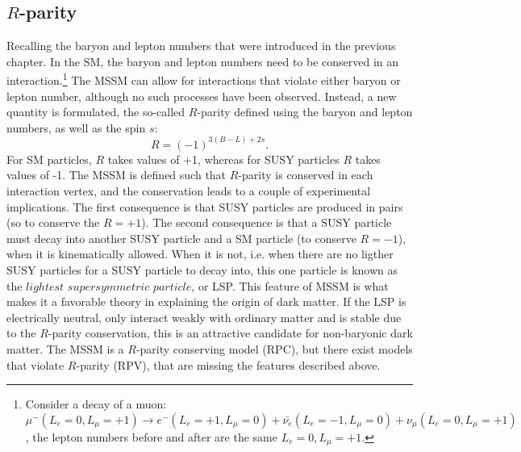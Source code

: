 \subsection*{$R$-parity}
\noindent\justify
Recalling the baryon and lepton numbers that were introduced in the previous chapter. 
In the SM, the baryon and lepton numbers need to be conserved in an interaction.\footnote{Consider a decay of a muon: $\mu^{-} (L_{e}=0, L_{\mu}=+1)\rightarrow e^{-} (L_{e}=+1, L_{\mu}=0) +\bar{\nu_{e}} (L_{e}=-1,L_{\mu}=0)+\nu_{\mu} (L_{e}=0,L_{\mu}=+1)$, the lepton numbers before and after are the same $L_{e}=0, L_{\mu}=+1$.}  
The MSSM can allow for interactions that violate either baryon or lepton number, although no such processes have been observed. 
Instead, a new quantity is formulated, the so-called $R$-parity \cite{Farrar:1978xj} defined using the baryon and lepton numbers, as well as the spin $s$:
\begin{equation}
R=(-1)^{3(B-L)+2s}.
\end{equation}
For SM particles, $R$ takes values of +1, whereas for SUSY particles $R$ takes values of -1. 
The MSSM is defined such that $R$-parity is conserved in each interaction vertex, and the conservation leads to a couple of experimental implications. 
The first consequence is that SUSY particles are produced in pairs (so to conserve the $R=+1$). 
The second consequence is that a SUSY particle must decay into another SUSY particle and a SM particle (to conserve $R=-1$), when it is kinematically allowed. 
When it is not, i.e. when there are no ligther SUSY particles for a SUSY particle to decay into, this one particle is known as the $lightest$ $supersymmetric$ $particle$, or LSP. 
This feature of MSSM is what makes it a favorable theory in explaining the origin of dark matter. 
If the LSP is electrically neutral, only interact weakly with ordinary matter and is stable due to the $R$-parity conservation, this is an attractive candidate for non-baryonic dark matter. 
The MSSM is a $R$-parity conserving model (RPC), but there exist models that violate $R$-parity (RPV), that are missing the features described above.
